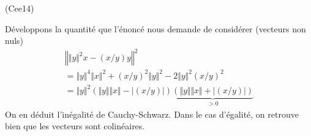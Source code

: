 \begin{tiny}(Cee14)\end{tiny} Développons la quantité que l'énoncé nous demande de considérer (vecteurs non nuls)
\begin{multline*}
 \left\Vert \Vert y\Vert^2x - (x/y)y \right \Vert^2\\
= \Vert y\Vert^4\Vert x\Vert^2 + (x/y)^2 \Vert y\Vert^2 -2\Vert y\Vert^2(x/y)^2\\
= \Vert y\Vert^2\left(\Vert y\Vert\Vert x\Vert -|(x/y)|\right)
\underset{> 0}{\underbrace{\left(\Vert y\Vert\Vert x\Vert +|(x/y)|\right)}} 
\end{multline*}
On en déduit l'inégalité de Cauchy-Schwarz. Dans le cas d'égalité, on retrouve bien que les vecteurs sont colinéaires.